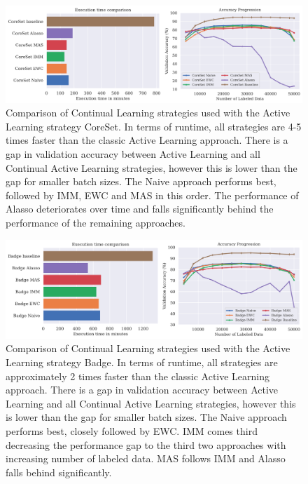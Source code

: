 \begin{figure} [ht]
    \centering
    \includegraphics[width=\linewidth]{images/results_CAL/CoreSet_CAL_4000b.png}
    \caption[Continual Active Learning CoreSet 4000 batch size]{Comparison of Continual Learning strategies used with the Active Learning strategy CoreSet. In terms of runtime, all
    strategies are 4-5 times faster than the classic Active Learning approach. There is a gap in validation accuracy between Active Learning and all Continual
    Active Learning strategies, however this is lower than the gap for smaller batch sizes. The Naive approach performs best, followed by IMM, EWC and MAS in this order. The performance
    of Alasso deteriorates over time and falls significantly behind the performance of the remaining approaches.}
    \label{fig:Evaluation:Results:CAL:CoreSet4000}
\end{figure}

\begin{figure} [ht]
    \centering
    \includegraphics[width=\linewidth]{images/results_CAL/Badge_CAL_4000b.png}
    \caption[Continual Active Learning Badge 4000 batch size]{Comparison of Continual Learning strategies used with the Active Learning strategy Badge. In terms of runtime, all
    strategies are approximately 2 times faster than the classic Active Learning approach. There is a gap in validation accuracy between Active Learning and all Continual
    Active Learning strategies, however this is lower than the gap for smaller batch sizes. The Naive approach performs best, closely followed by EWC. IMM comes third decreasing the
    performance gap to the third two approaches with increasing number of labeled data. MAS follows IMM and Alasso falls behind significantly.}
    \label{fig:Evaluation:Results:CAL:Badge4000}
\end{figure}


